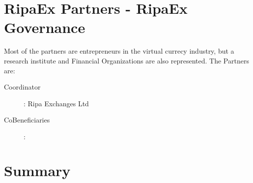 \documentclass[11pt,fleqn,oneside]{book} %
\begin{document}
\section{RipaEx Partners - RipaEx Governance}
Most of the partners are entrepreneurs in the virtual currecy industry, but a research institute 
and Financial Organizations are also represented. The Partners are:

\begin{description}
	\item[Coordinator]: Ripa Exchanges Ltd
	\item[CoBeneficiaries]: 
\end{description}

\section{Summary}
\end{document}
